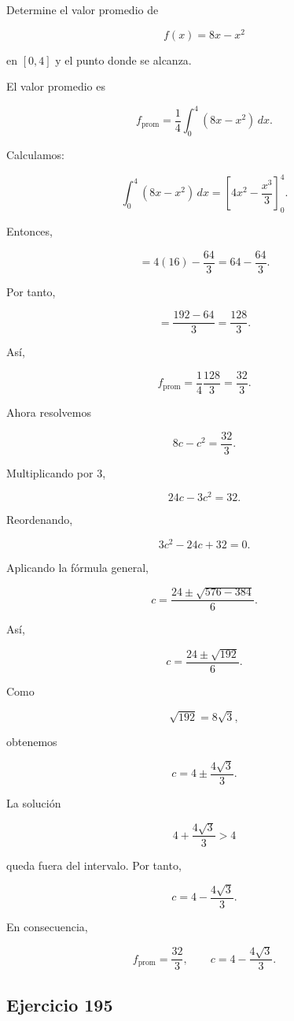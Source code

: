 \documentclass[12pt]{article}
\begin{document}
Determine el valor promedio de

\[
f(x)=8x-x^2
\]

en \([0,4]\) y el punto donde se alcanza.

El valor promedio es

\[
f_{\mathrm{prom}}
=
\frac14
\int_0^4(8x-x^2)\,dx.
\]

Calculamos:

\[
\int_0^4(8x-x^2)\,dx
=
\left[
4x^2-\frac{x^3}{3}
\right]_0^4.
\]

Entonces,

\[
=
4(16)-\frac{64}{3}
=
64-\frac{64}{3}.
\]

Por tanto,

\[
=
\frac{192-64}{3}
=
\frac{128}{3}.
\]

Así,

\[
f_{\mathrm{prom}}
=
\frac14\frac{128}{3}
=
\frac{32}{3}.
\]

Ahora resolvemos

\[
8c-c^2=\frac{32}{3}.
\]

Multiplicando por \(3\),

\[
24c-3c^2=32.
\]

Reordenando,

\[
3c^2-24c+32=0.
\]

Aplicando la fórmula general,

\[
c
=
\frac{24\pm\sqrt{576-384}}{6}.
\]

Así,

\[
c
=
\frac{24\pm\sqrt{192}}{6}.
\]

Como

\[
\sqrt{192}=8\sqrt3,
\]

obtenemos

\[
c
=
4\pm\frac{4\sqrt3}{3}.
\]

La solución

\[
4+\frac{4\sqrt3}{3}>4
\]

queda fuera del intervalo. Por tanto,

\[
\boxed{
c=
4-\frac{4\sqrt3}{3}
}.
\]

En consecuencia,

\[
\boxed{
f_{\mathrm{prom}}=\frac{32}{3},
\qquad
c=4-\frac{4\sqrt3}{3}
}.
\]

\subsection*{Ejercicio 195}
\end{document}
